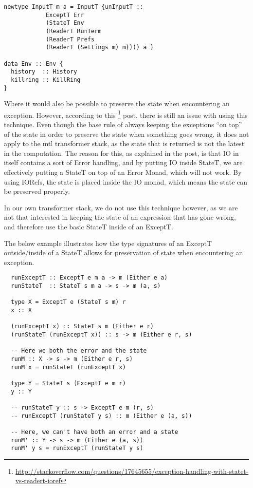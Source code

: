 \documentclass[11pt,a4paper]{article}
\begin{document}
\begin{verbatim}
newtype InputT m a = InputT {unInputT ::
            ExceptT Err
            (StateT Env
            (ReaderT RunTerm
            (ReaderT Prefs
            (ReaderT (Settings m) m)))) a }

data Env :: Env {
  history  :: History
  killring :: KillRing
}
\end{verbatim}

Where it would also be possible to preserve the state when encountering an
exception. However, according to this
\footnote{\url{http://stackoverflow.com/questions/17645655/exception-handling-with-statet-vs-readert-ioref}}
post, there is still an issue with using this technique. Even though the base
rule of always keeping the exceptions ``on top'' of the state in order to
preserve the state when something goes wrong, it does not apply to the mtl
transformer stack, as the state that is returned is not the latest in the
computation. The reason for this, as explained in the post, is that IO in
itself contains a sort of Error handling, and by putting IO inside StateT, we
are effectively putting a StateT on top of an Error Monad, which will not work.
By using IORefs, the state is placed inside the IO monad, which means the state
can be preserved properly.

In our own transformer stack, we do not use this technique however, as we are
not that interested in keeping the state of an expression that has gone wrong,
and therefore use the basic StateT inside of an ExceptT.

The below example illustrates how the type signatures of an ExceptT
outside/inside of a StateT allows for preservation of state when encountering
an exception.

\begin{verbatim}
  runExceptT :: ExceptT e m a -> m (Either e a)
  runStateT  :: StateT s m a -> s -> m (a, s)

  type X = ExceptT e (StateT s m) r
  x :: X

  (runExceptT x) :: StateT s m (Either e r)
  (runStateT (runExceptT x)) :: s -> m (Either e r, s)

  -- Here we both the error and the state
  runM :: X -> s -> m (Either e r, s)
  runM x = runStateT (runExceptT x)

  type Y = StateT s (ExceptT e m r)
  y :: Y

  -- runStateT y :: s -> ExceptT e m (r, s)
  -- runExceptT (runStateT y s) :: m (Either e (a, s))

  -- Here, we can't have both an error and a state
  runM' :: Y -> s -> m (Either e (a, s))
  runM' y s = runExceptT (runStateT y s)
\end{verbatim}
\end{document}
